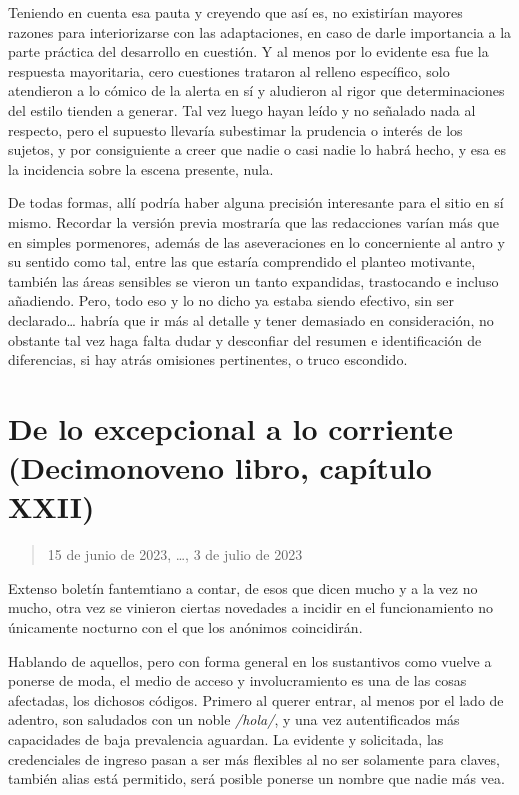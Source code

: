 \documentclass[
]{book}
\begin{document}
Teniendo en cuenta esa pauta y creyendo que así es, no existirían mayores razones para interiorizarse con las adaptaciones, en caso de darle importancia a la parte práctica del desarrollo en cuestión. Y al menos por lo evidente esa fue la respuesta mayoritaria, cero cuestiones trataron al relleno específico, solo atendieron a lo cómico de la alerta en sí y aludieron al rigor que determinaciones del estilo tienden a generar. Tal vez luego hayan leído y no señalado nada al respecto, pero el supuesto llevaría subestimar la prudencia o interés de los sujetos, y por consiguiente a creer que nadie o casi nadie lo habrá hecho, y esa es la incidencia sobre la escena presente, nula.

De todas formas, allí podría haber alguna precisión interesante para el sitio en sí mismo. Recordar la versión previa mostraría que las redacciones varían más que en simples pormenores, además de las aseveraciones en lo concerniente al antro y su sentido como tal, entre las que estaría comprendido el planteo motivante, también las áreas sensibles se vieron un tanto expandidas, trastocando e incluso añadiendo. Pero, todo eso y lo no dicho ya estaba siendo efectivo, sin ser declarado\ldots{} habría que ir más al detalle y tener demasiado en consideración, no obstante tal vez haga falta dudar y desconfiar del resumen e identificación de diferencias, si hay atrás omisiones pertinentes, o truco escondido.

\hypertarget{de-lo-excepcional-a-lo-corriente-decimonoveno-libro-capuxedtulo-xxii}{%
\section{De lo excepcional a lo corriente (Decimonoveno libro, capítulo XXII)}\label{de-lo-excepcional-a-lo-corriente-decimonoveno-libro-capuxedtulo-xxii}}

\begin{quote}
15 de junio de 2023, \ldots, 3 de julio de 2023
\end{quote}

Extenso boletín fantemtiano a contar, de esos que dicen mucho y a la vez no mucho, otra vez se vinieron ciertas novedades a incidir en el funcionamiento no únicamente nocturno con el que los anónimos coincidirán.

Hablando de aquellos, pero con forma general en los sustantivos como vuelve a ponerse de moda, el medio de acceso y involucramiento es una de las cosas afectadas, los dichosos códigos. Primero al querer entrar, al menos por el lado de adentro, son saludados con un noble \emph{/hola/}, y una vez autentificados más capacidades de baja prevalencia aguardan. La evidente y solicitada, las credenciales de ingreso pasan a ser más flexibles al no ser solamente para claves, también alias está permitido, será posible ponerse un nombre que nadie más vea.
\end{document}
